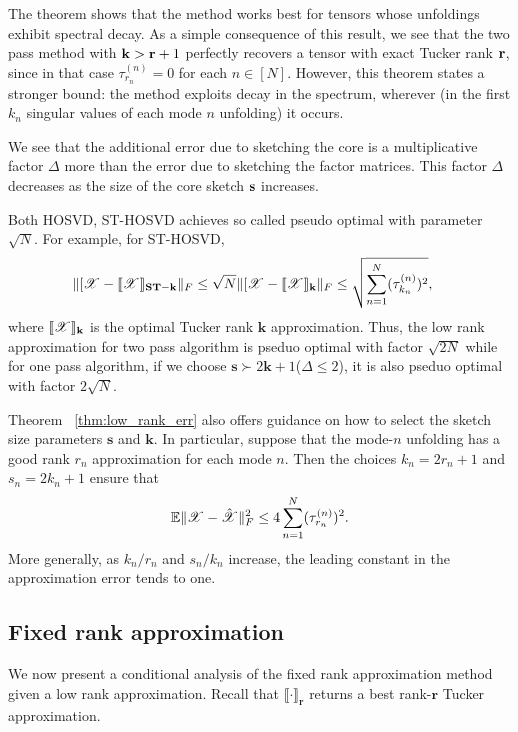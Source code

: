 The theorem shows that the method works best for tensors
whose unfoldings exhibit spectral decay.
As a simple consequence of this result, we see that the two pass method
with $\mathbf{k} > \mathbf{r}+1$
perfectly recovers a tensor with exact Tucker rank $\mathbf{r}$, since
in that case $\tau^{(n)}_{r_n} = 0$ for each $n \in [N]$.
However, this theorem states a stronger bound:
the method exploits decay in the spectrum,
wherever (in the first $k_n$ singular values of each mode $n$ unfolding)
it occurs.


We see that the additional error due to sketching the core
is a multiplicative factor $\Delta$ more than the error due to sketching
the factor matrices. This factor $\Delta$ decreases as the size of the
core sketch $\mathbf{s}$ increases.


\begin{remark}
	Both HOSVD, ST-HOSVD achieves so called pseudo optimal with parameter $\sqrt{N}$. For example, for ST-HOSVD, 
	\begin{equation}
	\begin{aligned}
	& \|[\T{X}-\llbracket \T{X} \rrbracket _{\mathbf{ST-k}}\|_F \le \sqrt{N} \|[\T{X}-\llbracket \T{X} \rrbracket _{\mathbf{k}}\|_F \le  \sqrt{\sum_{n=1}^N (\tau^{(n)}_{k_n})^2},
	\end{aligned}
	\end{equation}
	where $\llbracket \T{X} \rrbracket _{\mathbf{k}}$ is the optimal Tucker rank $\mathbf{k}$ approximation. Thus, the low rank approximation for two pass algorithm is pseduo optimal with factor $\sqrt{2N}$ while for one pass algorithm, if we choose $\mathbf{s}\succ 2\mathbf{k}+1$($\Delta\le 2$), it is also pseduo optimal with factor $2\sqrt{N}$. 
\end{remark}

Theorem ~\ref{thm:low_rank_err} also offers guidance on how to select
the sketch size parameters $\mathbf{s}$ and $\mathbf{k}$.  In particular,
suppose that the mode-$n$ unfolding has a good rank $r_n$ approximation
for each mode $n$.  Then the choices $k_n = 2r_n + 1$ and $s_n = 2k_n + 1$
ensure that
\begin{equation*}
\mathbb{E}\| \T{X} - \hat{\T{X}} \|_F^2
	\leq 4 \sum_{n=1}^N (\tau_{r_n}^{(n)})^2.
\end{equation*}
More generally, as $k_n/r_n$ and $s_n/k_n$ increase,
the leading constant in the approximation error tends to one.

\subsection{Fixed rank approximation}
We now present a conditional analysis of the fixed rank approximation method given a low rank approximation.
Recall that $\llbracket \cdot \rrbracket_{\mathbf{r}}$ returns a best rank-$\mathbf{r}$ Tucker approximation.

